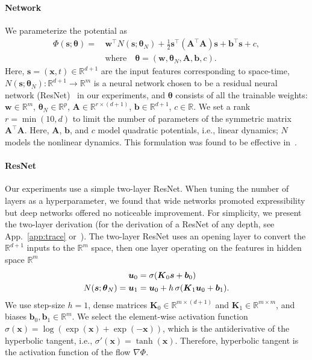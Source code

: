 \documentclass[letterpaper]{article}
\newcommand{\bfth}{\boldsymbol{\theta}}
\newcommand{\bfb}{\boldsymbol{b}}
\newcommand{\bfs}{\boldsymbol{s}}
\newcommand{\bfu}{\boldsymbol{u}}
\newcommand{\bfw}{\boldsymbol{w}}
\newcommand{\bfx}{\boldsymbol{x}}
\newcommand{\bfA}{\boldsymbol{A}}
\newcommand{\bfK}{\boldsymbol{K}}
\newcommand{\R}{\ensuremath{\mathds{R}}}
\begin{document}
\paragraph{Network}
	We parameterize the potential as%
	\begin{equation}%
	\label{eq:NNArchitecture}
	\begin{split}
	  \Phi(\bfs ; \bfth) = \, &\bfw^\top N(\bfs;\bfth_N) + \frac{1}{2} \bfs^\top (\bfA^\top 
	  \bfA)\bfs + \bfb^\top \bfs + c,\\ &\text{where} \quad\bfth = (\bfw, \bfth_N, \bfA, \bfb, c).
	\end{split}
	\end{equation}%
	Here, $\bfs = (\bfx,t) \in \R^{d+1}$ are the input features corresponding to space-time, $N(\bfs;\bfth_N) \colon \R^{d+1} \to \R^m$ is a neural network chosen to be a residual neural network (ResNet)~\cite{he2016deep} in our experiments, and $\bfth$ consists of all the trainable weights: $\bfw \in \R^m$, $\bfth_N \in \R^p$, $\bfA \in \R^{r \times (d+1)}$, $\bfb \in \R^{d+1}$, $c \in \R$.
	We set a rank $r=\min (10,d)$ to limit the number of parameters of the symmetric matrix $\bfA^\top \bfA$. Here, $\bfA$, $\bfb$, and $c$ model quadratic potentials, i.e., linear dynamics; $N$ models the nonlinear dynamics. This formulation was found to be effective in~\citet{ruthotto2020machine}.

\paragraph{ResNet}
	Our experiments use a simple two-layer ResNet. When tuning the number of layers as a hyperparameter, we found that wide networks promoted expressibility but deep networks offered no noticeable improvement. 
	For simplicity, we present the two-layer derivation (for the derivation of a ResNet of any depth, see App.~\ref{app:trace} or~\citealt{ruthotto2020machine}). 	
	The two-layer ResNet uses an opening layer to convert the $\R^{d+1}$ inputs to the $\R^{m}$ space, then one layer operating on the features in hidden space $\R^{m}$
	\begin{equation}
	\begin{split}
	    \bfu_0 & = \sigma(\bfK_0 \bfs + \bfb_0) \\ 
	   N(\bfs;\bfth_N) =  \bfu_1 & = \bfu_0 + h \, \sigma(\bfK_1 \bfu_0 + \bfb_1).
\bf	\end{split}
	\end{equation}
	We use step-size $h{=}1$, dense matrices $\bfK_0 \in \R^{m \times (d+1)}$ and $\bfK_1 \in \R^{m \times m}$, and biases $\bfb_0, \bfb_1 \in \R^{m}$. We select the element-wise activation function 
	$\sigma(\bfx) =\log(\exp(\bfx) + \exp(-\bfx))$, which is the antiderivative of the hyperbolic tangent, i.e., $\sigma'(\bfx) = \tanh(\bfx)$. Therefore, hyperbolic tangent is the activation function of the flow $\nabla \Phi$.
\end{document}
